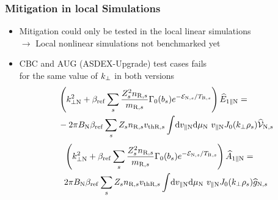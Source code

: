 \documentclass[compress,aspectratio=1610,noflama]{beamer}
\newcommand{\spec}[1]{#1_s}
\newcommand{\specN}[1]{#1_{\mathrm{N},s}}
\newcommand{\specR}[1]{#1_{\mathrm{R},s}}
\newcommand{\specthR}[1]{#1_{\mathrm{th}\mathrm{R},s}}
\newcommand{\ints}{\int \!}
\begin{document}
	\begin{frame}
		\frametitle{Mitigation in local Simulations}
		
		\begin{center}
			\begin{itemize}
				\item <2-> Mitigation could only be tested in the local linear simulations \\ $\rightarrow$ Local nonlinear simulations not benchmarked yet
				\item <3-> CBC and AUG (ASDEX-Upgrade) test cases fails \\ for the same value of $k_\perp$ in both versions
				\begin{align*}
					&\left(\kperpN^2 + \betaref \spec{\sum} \frac{\spec{Z^2}\specR{n}}{\specR{m}} \Gamma_0(\spec{b}) e^{-\specN{\cfen}/\specR{T}} \right) \FEparN = \\
					&- 2\pi\BN \betaref \spec{\sum} \spec{Z} \specR{n} \specthR{v} \ints \dvparN \dmuN ~ \vparN J_0(\kperp \spec{\rho}) \specN{\Frhs}
				\end{align*}
				\begin{align*}
					&\left(\kperpN^2 + \betaref \spec{\sum} \frac{\spec{Z^2}\specR{n}}{\specR{m}} \Gamma_0(\spec{b}) e^{-\specN{\cfen}/\specR{T}} \right) \FAparN = \\
					& 2\pi\BN \betaref \spec{\sum} \spec{Z} \specR{n} \specthR{v} \ints \dvparN \dmuN ~ \vparN J_0(\kperp \spec{\rho}) \specN{\widehat{g}}
				\end{align*}

			\end{itemize}
		\end{center}
	
	\end{frame}
\end{document}
